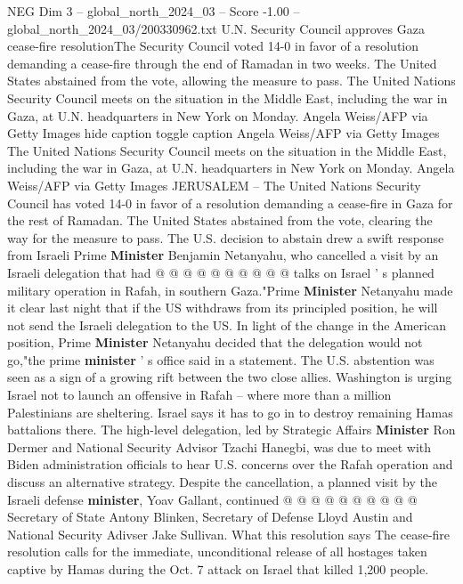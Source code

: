 \begin{textsample}{NEG Dim 3 – global\_north\_2024\_03 – Score -1.00 – global\_north\_2024\_03/200330962.txt}  \label{ex:f3_neg_183}
U.N.
Security Council approves Gaza cease-fire resolutionThe Security Council voted 14-0 in favor of a resolution demanding a cease-fire through the end of Ramadan in two weeks.
The United States abstained from the vote, allowing the measure to pass.
The United Nations Security Council meets on the situation in the Middle East, including the war in Gaza, at U.N. headquarters in New York on Monday.
Angela Weiss/AFP via Getty Images hide caption toggle caption Angela Weiss/AFP via Getty Images The United Nations Security Council meets on the situation in the Middle East, including the war in Gaza, at U.N. headquarters in New York on Monday.
Angela Weiss/AFP via Getty Images JERUSALEM -- The United Nations Security Council has voted 14-0 in favor of a resolution demanding a cease-fire in Gaza for the rest of Ramadan.
The United States abstained from the vote, clearing the way for the measure to pass.
The U.S. decision to abstain drew a swift response from Israeli Prime \textbf{Minister} Benjamin Netanyahu, who cancelled a visit by an Israeli delegation that had @ @ @ @ @ @ @ @ @ @ talks on Israel ' s planned military operation in Rafah, in southern Gaza."Prime \textbf{Minister} Netanyahu made it clear last night that if the US withdraws from its principled position, he will not send the Israeli delegation to the US.
In light of the change in the American position, Prime \textbf{Minister} Netanyahu decided that the delegation would not go,"the prime \textbf{minister} ' s office said in a statement.
The U.S. abstention was seen as a sign of a growing rift between the two close allies.
Washington is urging Israel not to launch an offensive in Rafah -- where more than a million Palestinians are sheltering.
Israel says it has to go in to destroy remaining Hamas battalions there.
The high-level delegation, led by Strategic Affairs \textbf{Minister} Ron Dermer and National Security Advisor Tzachi Hanegbi, was due to meet with Biden administration officials to hear U.S. concerns over the Rafah operation and discuss an alternative strategy.
Despite the cancellation, a planned visit by the Israeli defense \textbf{minister}, Yoav Gallant, continued @ @ @ @ @ @ @ @ @ @ Secretary of State Antony Blinken, Secretary of Defense Lloyd Austin and National Security Adivser Jake Sullivan.
What this resolution says The cease-fire resolution calls for the immediate, unconditional release of all hostages taken captive by Hamas during the Oct. 7 attack on Israel that killed 1,200 people.

\end{textsample}
